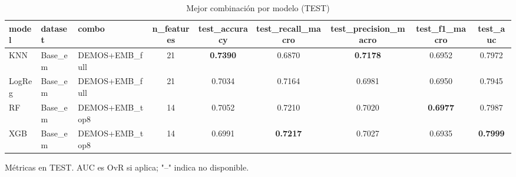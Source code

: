
\begin{table}[ht]
\centering
\begin{threeparttable}
\caption{Mejor combinación por modelo (TEST)}
\label{tab:best_by_model}
\begin{tabular}{@{} l l l S S S S S S @{}}
\toprule
model & dataset & combo & n_features & test_accuracy & test_recall_macro & test_precision_macro & test_f1_macro & test_auc \\
\midrule
KNN & Base_em & DEMOS+EMB_full & 21 & \textbf{0.7390} & 0.6870 & \textbf{0.7178} & 0.6952 & 0.7972 \\
LogReg & Base_em & DEMOS+EMB_full & 21 & 0.7034 & 0.7164 & 0.6981 & 0.6950 & 0.7945 \\
RF & Base_em & DEMOS+EMB_top8 & 14 & 0.7052 & 0.7210 & 0.7020 & \textbf{0.6977} & 0.7987 \\
XGB & Base_em & DEMOS+EMB_top8 & 14 & 0.6991 & \textbf{0.7217} & 0.7027 & 0.6935 & \textbf{0.7999} \\
\bottomrule
\end{tabular}

\begin{tablenotes}\footnotesize
\item Métricas en TEST. AUC es OvR si aplica; "--" indica no disponible.
\end{tablenotes}
\end{threeparttable}
\end{table}
